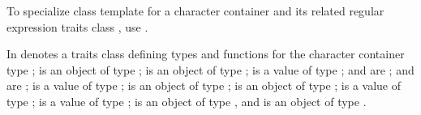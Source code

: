 \pnum
To specialize class template  for a character
container  and its related regular
expression traits class , use .

\pnum
{}%
%
%
%
In   denotes a traits class
defining types and functions for the character container
type ;  is an object of
type ;  is an object of type ;  is a value of type ; 
and  are ;
 and  are ;
 is a value of type ;
 is an object of type ;
 is an object of type ;
 is a value of  type ;
 is a value of type ;
 is an object of type ,
and  is an object of type .

